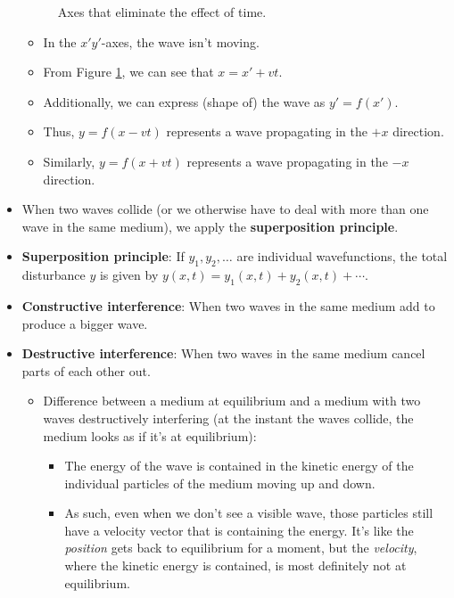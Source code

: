 \documentclass[../notes.tex]{subfiles}
\begin{document}
\begin{itemize}
\begin{figure}[h!]
        \caption{Axes that eliminate the effect of time.}
        \label{fig:axesXprimeYprime}
    \end{figure}
    \begin{itemize}
        \item In the $x'y'$-axes, the wave isn't moving.
        \item From Figure \ref{fig:axesXprimeYprime}, we can see that $x=x'+vt$.
        \item Additionally, we can express (shape of) the wave as $y'=f(x')$.
        \item Thus, $y=f(x-vt)$ represents a wave propagating in the $+x$ direction.
        \item Similarly, $y=f(x+vt)$ represents a wave propagating in the $-x$ direction.
    \end{itemize}
    \item When two waves collide (or we otherwise have to deal with more than one wave in the same medium), we apply the \textbf{superposition principle}.
    \item \textbf{Superposition principle}: If $y_1,y_2,\dots$ are individual wavefunctions, the total disturbance $y$ is given by $y(x,t)=y_1(x,t)+y_2(x,t)+\cdots$.
    \item \textbf{Constructive interference}: When two waves in the same medium add to produce a bigger wave.
    \item \textbf{Destructive interference}: When two waves in the same medium cancel parts of each other out.
    \begin{itemize}
        \item Difference between a medium at equilibrium and a medium with two waves destructively interfering (at the instant the waves collide, the medium looks as if it's at equilibrium):
        \begin{itemize}
            \item The energy of the wave is contained in the kinetic energy of the individual particles of the medium moving up and down.
            \item As such, even when we don't see a visible wave, those particles still have a velocity vector that is containing the energy. It's like the \emph{position} gets back to equilibrium for a moment, but the \emph{velocity}, where the kinetic energy is contained, is most definitely not at equilibrium.

\end{itemize}
\end{itemize}
\end{itemize}
\end{document}

